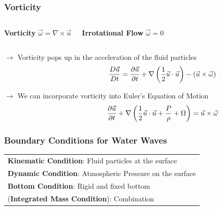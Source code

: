 \documentclass[fleqn]{beamer}
\newcommand{\tabitem}{%
  \usebeamertemplate{itemize item}\hspace*{\labelsep}}
\begin{document}
    \begin{frame}
        \frametitle{Vorticity}
        \begin{columns}
            \begin{block}{\centering\textbf{Vorticity}}
                \centering
                $\vec{\omega} = \nabla \times \vec{u}$
            \end{block}
            \begin{block}{\centering\textbf{Irrotational Flow}}
                \centering
                $\vec{\omega} = 0$
            \end{block}
        \end{columns}
        \vspace{0.5cm}

        \centering $\rightarrow$ Vorticity pops up in the acceleration of
        the fluid particles
        \begin{align}
            \hspace{0.25\linewidth}
            \frac{D\vec{u}}{Dt} = \frac{\partial \vec{u}}{\partial t}+
            \nabla \left( \frac{1}{2} \vec{u} \cdot \vec{u}\right)  - \left(
            \vec{u}\times \vec{\omega}  \right)\nonumber
        \end{align}

        \centering $\rightarrow$ We can incorporate vorticity into Euler's
        Equation of Motion
        \begin{align}
            \hspace{0.25\linewidth}\frac{\partial \vec{u}}{\partial t} + \nabla\left(
            \frac{1}{2}\vec{u}\cdot\vec{u} + \frac{P}{\rho} + \Omega \right)
            = \vec{u} \times \vec{\omega} \nonumber
        \end{align}
    \end{frame}

    \begin{frame}
        \frametitle{Boundary Conditions for Water Waves}
        \begin{center}
        \begin{tabular}{@{}l@{}}
        \tabitem \textbf{Kinematic Condition}: Fluid particles at the
            surface\\
        \tabitem \textbf{Dynamic Condition}: Atmospheric Pressure on
            the surface\\
        \tabitem \textbf{Bottom Condition}: Rigid and fixed bottom\\
        \tabitem (\textbf{Integrated Mass Condition}): Combination
        \end{tabular}
        \end{center}
   \end{frame}
\end{document}
